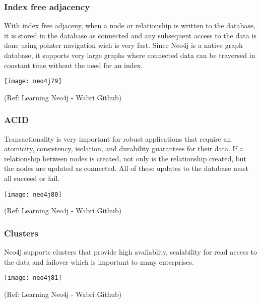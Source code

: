 \begin{frame}\frametitle{Index free adjacency }
With index free adjaceny, when a node or relationship is written to the database, it is stored in the database as connected and any subsequent access to the data is done using pointer navigation wich is very fast. Since Neo4j is a native graph database, it supports very large graphs where connected data can be traversed in constant time without the need for an index.

\begin{center}
\texttt{[image: neo4j79]}
\end{center}	

{\tiny (Ref: Learning Neo4j - Wabri Github)}
\end{frame}

\begin{frame}\frametitle{ACID }
Transactionality is very important for robust applications that require an atomicity, consistency, isolation, and durability guarantees for their data. If a relationship between nodes is created, not only is the relationship created, but the nodes are updated as connected. All of these updates to the database must all succeed or fail.


\begin{center}
\texttt{[image: neo4j80]}
\end{center}	

{\tiny (Ref: Learning Neo4j - Wabri Github)}
\end{frame}

\begin{frame}\frametitle{Clusters }
Neo4j supports clusters that provide high availablity, scalability for read access to the data and failover which is important to many enterprises.

\begin{center}
\texttt{[image: neo4j81]}
\end{center}	

{\tiny (Ref: Learning Neo4j - Wabri Github)}
\end{frame}

